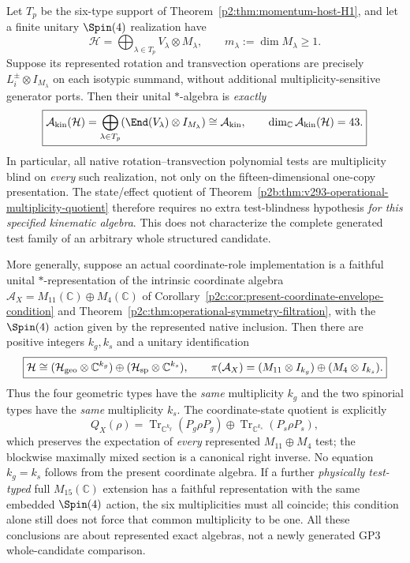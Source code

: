 \documentclass[12pt,a4paper]{article}
\begin{document}
\begin{theorem}
\label{p2c:thm:v294-native-multiplicity-algebra}
Let $T_p$ be the six-type support of
Theorem~\ref{p2:thm:momentum-host-H1}, and let a finite unitary
$\Spin(4)$ realization have
\[
 \mathcal H=\bigoplus_{\lambda\in T_p}V_\lambda\otimes M_\lambda,
 \qquad m_\lambda:=\dim M_\lambda\geq1.
\]
Suppose its represented rotation and transvection operations are precisely
$L_i^\pm\otimes I_{M_\lambda}$ on each isotypic summand, without
additional multiplicity-sensitive generator ports. Then their unital
$*$-algebra is \emph{exactly}
\[
 \boxed{\mathcal A_{\rm kin}(\mathcal H)
 =\bigoplus_{\lambda\in T_p}
 (\End(V_\lambda)\otimes I_{M_\lambda})
 \cong\mathcal A_{\rm kin},\qquad
 \dim_{\mathbb C}\mathcal A_{\rm kin}(\mathcal H)=43.}
\]
In particular, all native rotation--transvection polynomial tests are
multiplicity blind on \emph{every} such realization, not only on the
fifteen-dimensional one-copy presentation. The state/effect quotient of
Theorem~\ref{p2b:thm:v293-operational-multiplicity-quotient} therefore
requires no extra test-blindness hypothesis \emph{for this specified
kinematic algebra}. This does not characterize the complete generated test
family of an arbitrary whole structured candidate.

More generally, suppose an actual coordinate-role implementation is a
faithful unital $*$-representation of the intrinsic coordinate algebra
$\mathcal A_X=M_{11}(\mathbb C)\oplus M_4(\mathbb C)$ of
Corollary~\ref{p2c:cor:present-coordinate-envelope-condition} and
Theorem~\ref{p2c:thm:operational-symmetry-filtration}, with the
$\Spin(4)$ action given by the represented native inclusion. Then there
are positive integers $k_g,k_s$ and a unitary identification
\[
 \boxed{\mathcal H\cong
 (\mathcal H_{\rm geo}\otimes\mathbb C^{k_g})
 \oplus(\mathcal H_{\rm sp}\otimes\mathbb C^{k_s}),\qquad
 \pi(\mathcal A_X)=
 (M_{11}\otimes I_{k_g})\oplus(M_4\otimes I_{k_s}).}
\]
Thus the four geometric types have the \emph{same} multiplicity $k_g$
and the two spinorial types have the \emph{same} multiplicity $k_s$.
The coordinate-state quotient is explicitly
\[
 Q_X(\rho)=\operatorname{Tr}_{\mathbb C^{k_g}}(P_g\rho P_g)
 \oplus\operatorname{Tr}_{\mathbb C^{k_s}}(P_s\rho P_s),
\]
which preserves the expectation of \emph{every} represented
$M_{11}\oplus M_4$ test; the blockwise maximally mixed section is a
canonical right inverse. No equation $k_g=k_s$ follows from the present coordinate algebra.
If a further \emph{physically test-typed} full $M_{15}(\mathbb C)$
extension has a faithful representation with the same embedded
$\Spin(4)$ action, the six multiplicities must all coincide; this
condition alone still does not force that common multiplicity to be one.
All these conclusions are about represented exact algebras, not a
newly generated GP3 whole-candidate comparison.
\end{theorem}
\end{document}
